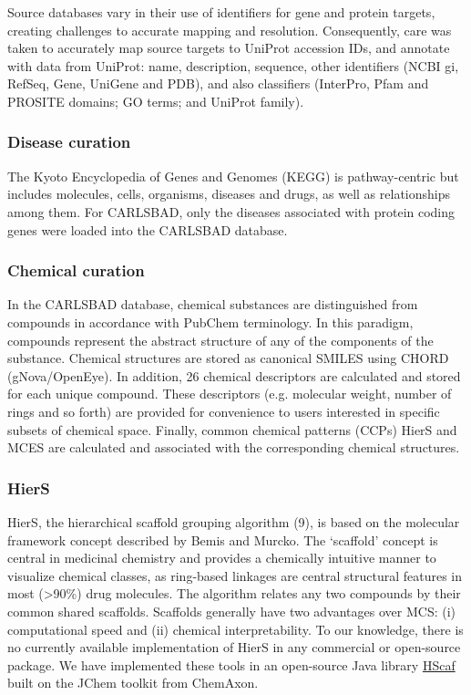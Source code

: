 Source databases vary in their use of identifiers for gene and protein targets, creating challenges to accurate mapping and resolution. Consequently, care was taken to accurately map source targets to UniProt accession IDs, and annotate with data from UniProt\cite{UniProt_Consortium2018-kq}: name, description, sequence, other identifiers (NCBI gi, RefSeq, Gene, UniGene and PDB), and also classifiers (InterPro, Pfam and PROSITE domains; GO terms; and UniProt family).

\subsubsection{Disease curation}

The Kyoto Encyclopedia of Genes and Genomes (KEGG) is pathway-centric but includes molecules, cells, organisms, diseases and drugs, as well as relationships among them\cite{Kanehisa2008-zv}. For CARLSBAD, only the diseases associated with protein coding genes were loaded into the CARLSBAD database.

\subsubsection{Chemical curation}

In the CARLSBAD database, chemical substances are distinguished from compounds in accordance with PubChem terminology. In this paradigm, compounds represent the abstract structure of any of the components of the substance. Chemical structures are stored as canonical SMILES using CHORD (gNova/OpenEye).  In addition, 26 chemical descriptors are calculated and stored for each unique compound. These descriptors (e.g. molecular weight, number of rings and so forth) are provided for convenience to users interested in specific subsets of chemical space. Finally, common chemical patterns (CCPs) HierS and MCES are calculated and associated with the corresponding chemical structures.

\subsubsection{HierS}

HierS, the hierarchical scaffold grouping algorithm\cite{Wilkens2005-ja} (9), is based on the molecular framework concept described by Bemis and Murcko\cite{Bemis1996-jg}. The ‘scaffold’ concept is central in medicinal chemistry and provides a chemically intuitive manner to visualize chemical classes, as ring-based linkages are central structural features in most (\textgreater 90\%) drug molecules. The algorithm relates any two compounds by their common shared scaffolds. Scaffolds generally have two advantages over MCS: (i) computational speed and (ii) chemical interpretability. To our knowledge, there is no currently available implementation of HierS in any commercial or open-source package. We have implemented these tools in an open-source Java library \href{https://github.com/unmtransinfo/unm_biocomp_hscaf}{HScaf}\cite{Yang2012-qd} built on the JChem toolkit from ChemAxon.

